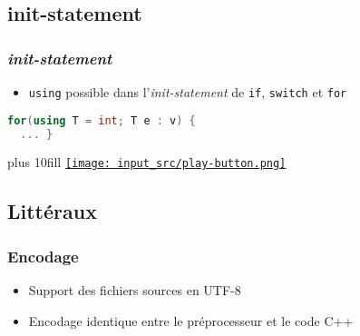 \documentclass[C++.tex]{subfiles}
\begin{document}
\subsection*{init-statement}
\begin{frame}[fragile]
	\frametitle{\textit{init-statement}}
	\begin{itemize}
		\item \lstinline|using| possible dans l'\textit{init-statement} de \lstinline|if|, \lstinline|switch| et \lstinline|for|
	\end{itemize}

	\begin{lstlisting}[language=C++]
for(using T = int; T e : v) {
  ... }\end{lstlisting}


	\vskip 10mm plus 10fill
	\hfill
	\href{https://godbolt.org/#g:!((g:!((g:!((h:codeEditor,i:(filename:'1',fontScale:14,fontUsePx:'0',j:1,lang:c%2B%2B,selection:(endColumn:1,endLineNumber:13,positionColumn:1,positionLineNumber:13,selectionStartColumn:1,selectionStartLineNumber:1,startColumn:1,startLineNumber:1),source:'%23include+%3Ciostream%3E%0A%23include+%3Cvector%3E%0A%0Aint+main()%0A%7B%0A++std::vector%3Cint%3E+v%7B1,+2,+5%7D%3B%0A+%0A++for(using+T+%3D+int%3B+T+e+:+v)%0A++%7B%0A++++std::cout+%3C%3C+e+%3C%3C+%22%5Cn%22%3B%0A++%7D%0A%7D%0A'),l:'5',n:'0',o:'C%2B%2B+source+%231',t:'0')),k:50,l:'4',n:'0',o:'',s:0,t:'0'),(g:!((h:executor,i:(argsPanelShown:'1',compilationPanelShown:'0',compiler:g122,compilerName:'',compilerOutShown:'0',execArgs:'',execStdin:'',fontScale:14,fontUsePx:'0',j:1,lang:c%2B%2B,libs:!((name:boost,ver:'175')),options:'-std%3Dc%2B%2B23+-Wall+-Wextra+-pedantic',source:1,stdinPanelShown:'1',tree:'1',wrap:'0'),l:'5',n:'0',o:'Executor+x86-64+gcc+12.2+(C%2B%2B,+Editor+%231)',t:'0')),header:(),k:50,l:'4',n:'0',o:'',s:0,t:'0')),l:'2',n:'0',o:'',t:'0')),version:4}{\texttt{[image: input\_src/play-button.png]}}
\end{frame}

\subsection*{Littéraux}
\begin{frame}[fragile]
	\frametitle{Encodage}
	\begin{itemize}
		\item Support des fichiers sources en UTF-8


		\item Encodage identique entre le préprocesseur et le code C++

	\end{itemize}
\end{frame}
\end{document}

